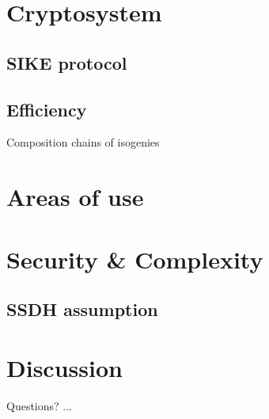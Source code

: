 \documentclass{beamer}
\begin{document}
\section{Cryptosystem}

\subsection{SIKE protocol}
\subsection{Efficiency}

\begin{frame}{Composition chains of isogenies}
\end{frame}

\section{Areas of use}

\section{Security \& Complexity}
\subsection{SSDH assumption}


\section{Discussion}
\begin{frame}{Questions?}
...
\end{frame}
\end{document}
